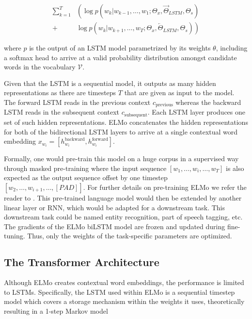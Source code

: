 \documentclass[a4paper,12pt,oneside,openright]{report}
\begin{document}
\begin{align} 
\sum_{k=1}^{T} &\left(\log p\left(w_{k} | w_{k-1}, \ldots, w_{1} ; \Theta_{x}, \vec{\Theta}_{L S T M}, \Theta_{s}\right)\right.\\
+&\left.\log p\left(w_{k} | w_{k+1}, \ldots, w_{T}; \Theta_{x}, \overleftarrow{\Theta}_{L S T M}, \Theta_{s}\right)\right) 
\end{align}

where $p$ is the output of an LSTM model parametrized by its weights $\theta$, including a softmax head to arrive at a valid probability distribution amongst candidate words in the vocabulary $\mathcal{V}$.

Given that the LSTM is a sequential model, it outputs as many hidden representations as there are timesteps $T$ that are given as input to the model. 
The forward LSTM reads in the previous context $c_\text{previous}$ whereas the backward LSTM reads in the subsequent context $c_\text{subsequent}$.
Each LSTM layer produces one set of such hidden representations.
ELMo concatenates the hidden representations for both of the bidirectional LSTM layers to arrive at a single contextual word embedding $x_{w_i} = [h^\text{backward}_{w_i}, h^\text{forward}_{w_i}]$.

Formally, one would pre-train this model on a huge corpus in a supervised way through masked pre-training where the input sequence $[w_1, \ldots , w_i, \ldots, w_T]$ is also expected as the output sequence offset by one timestep $[w_2, \ldots, w_{i+1}, \ldots , [PAD] ]$.
For further details on pre-training ELMo we refer the reader to \cite{jozefowicz16}.
This pre-trained language model would then be extended by another linear layer or RNN, which would be adapted for a downstream task.
This downstream task could be named entity recognition, part of speech tagging, etc.
The gradients of the ELMo biLSTM model are frozen and updated during fine-tuning.
Thus, only the weights of the task-specific parameters are optimized. 

\subsection{The Transformer Architecture}

Although ELMo creates contextual word embeddings, the performance is limited to LSTMs.
Specifically, the LSTM used within ELMo is a sequential timestep model which covers a storage mechanism within the weights it uses, theoretically resulting in a 1-step Markov model
\end{document}
